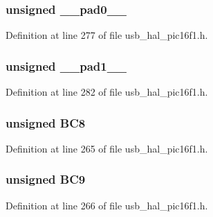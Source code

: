 \subsubsection[{\+\_\+\+\_\+pad0\+\_\+\+\_\+}]{\setlength{\rightskip}{0pt plus 5cm}unsigned \+\_\+\+\_\+pad0\+\_\+\+\_\+}\label{union___b_d___s_t_a_t_adf71f3d8410c1f1dbbc96680a92c49af}


Definition at line 277 of file usb\+\_\+hal\+\_\+pic16f1.\+h.

\hypertarget{union___b_d___s_t_a_t_acaf2d0924a107ec6e8d2e31febaf66f9}{}
\subsubsection[{\+\_\+\+\_\+pad1\+\_\+\+\_\+}]{\setlength{\rightskip}{0pt plus 5cm}unsigned \+\_\+\+\_\+pad1\+\_\+\+\_\+}\label{union___b_d___s_t_a_t_acaf2d0924a107ec6e8d2e31febaf66f9}


Definition at line 282 of file usb\+\_\+hal\+\_\+pic16f1.\+h.

\hypertarget{union___b_d___s_t_a_t_a5d5010d284e6c86702a4ce3063f4cca5}{}
\subsubsection[{B\+C8}]{\setlength{\rightskip}{0pt plus 5cm}unsigned B\+C8}\label{union___b_d___s_t_a_t_a5d5010d284e6c86702a4ce3063f4cca5}


Definition at line 265 of file usb\+\_\+hal\+\_\+pic16f1.\+h.

\hypertarget{union___b_d___s_t_a_t_af499c0fe1fd8eba827eb024bf69841e9}{}
\subsubsection[{B\+C9}]{\setlength{\rightskip}{0pt plus 5cm}unsigned B\+C9}\label{union___b_d___s_t_a_t_af499c0fe1fd8eba827eb024bf69841e9}


Definition at line 266 of file usb\+\_\+hal\+\_\+pic16f1.\+h.

